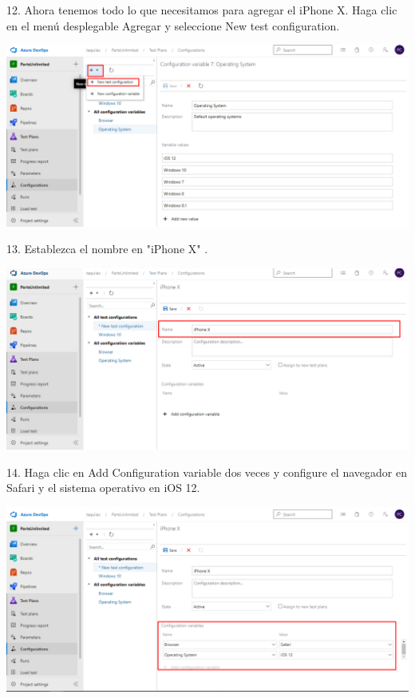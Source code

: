 \documentclass[12pt,letterpaper]{article}
\begin{document}
12. Ahora tenemos todo lo que necesitamos para agregar el iPhone X. Haga clic en el menú desplegable Agregar y seleccione New test configuration.

\begin{center}
		\includegraphics[width=15cm]{./Imagenes/23} 
\end{center}

13. Establezca el nombre en "iPhone X" .

\begin{center}
		\includegraphics[width=15cm]{./Imagenes/24} 
\end{center}

14. Haga clic en Add Configuration variable dos veces y configure el navegador en Safari y el sistema operativo en iOS 12.

\begin{center}
		\includegraphics[width=15cm]{./Imagenes/25} 
\end{center}
\end{document}
